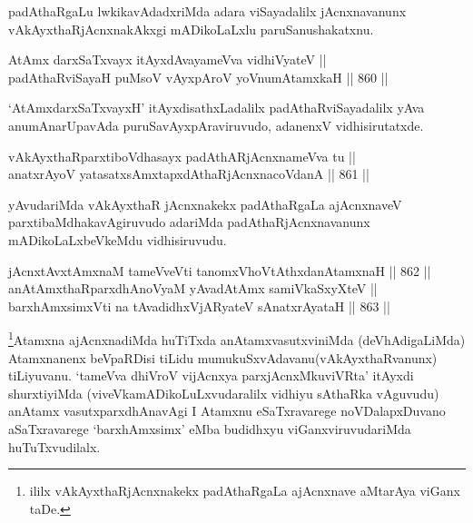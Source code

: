 \begin{artha}
padAthaRgaLu lwkikavAdadxriMda adara viSayadalilx jAcnxnavanunx vAkAyxthaRjAcnxnakAkxgi mADikoLaLxlu paruSanushakatxnu.
\end{artha}

\begin{shl}
AtAmx darxSaTxvayx itAyxdAvayameVva vidhiVyateV || \\
padAthaRviSayaH puMsoV vAyxpAroV yoV\s numAtamxkaH \hfill || 860 ||  
\end{shl}

\begin{artha}
`AtAmxdarxSaTxvayxH' itAyxdisathxLadalilx padAthaRviSayadalilx yAva anumAnarUpavAda puruSavAyxpAraviruvudo, adanenxV vidhisirutatxde.
\end{artha}

\begin{shl}
vAkAyxthaRparxtiboVdhasayx padAthARjAcnxnameVva tu || \\
anatxrAyoV yatasatxsAmxtapxdAthaRjAcnxnacoVdanA \hfill || 861 ||  
\end{shl}

\begin{artha}
yAvudariMda vAkAyxthaR jAcnxnakekx padAthaRgaLa ajAcnxnaveV parxtibaMdhakavAgiruvudo adariMda padAthaRjAcnxnavanunx mADikoLaLxbeVkeMdu vidhisiruvudu.
\end{artha}


\begin{shl}
jAcnxtAvx\s \s tAmxnaM tameVveVti tanomxVhoVtAthxdanAtamxnaH \hfill || 862 ||  \\
anAtAmxthaRparxdhAnoV\s yaM yAvadAtAmx samiVkaSxyXteV || \\
barxhAmxsimxVti na tAvadidhxVjARyateV sAnatxrAyataH \hfill || 863 ||  
\end{shl}

\begin{artha}
\footnote{ililx vAkAyxthaRjAcnxnakekx padAthaRgaLa ajAcnxnave aMtarAya viGanx taDe.}Atamxna ajAcnxnadiMda huTiTxda anAtamxvasutxviniMda (deVhAdigaLiMda) Atamxnanenx beVpaRDisi tiLidu mumukuSxvAdavanu(vAkAyxthaRvanunx) tiLiyuvanu. `tameVva dhiVroV vijAcnxya parxjAcnxMkuviVRta' itAyxdi shurxtiyiMda (viveVkamADikoLuLxvudaralilx vidhiyu sAthaRka vAguvudu) anAtamx vasutxparxdhAnavAgi I Atamxnu eSaTxravarege noVDalapxDuvano aSaTxravarege `barxhAmxsimx' eMba budidhxyu viGanxviruvudariMda huTuTxvudilalx.
\end{artha}

